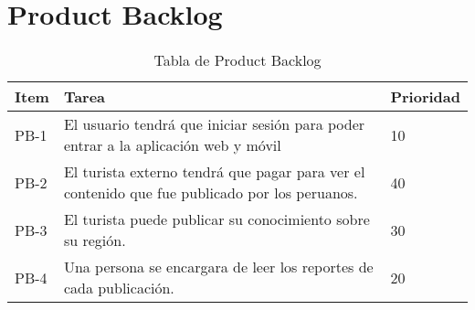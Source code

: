 \chapter{Product Backlog}
\begin{table}[htbp]
	\begin{center}
		\begin{tabular}{|l|p{5cm}|l|}
			\hline
			Item & Tarea & Prioridad \\
			\hline \hline
			PB-1 & El usuario tendrá que iniciar sesión para poder entrar a la aplicación web y móvil			
			& 10
			\\ \hline
			PB-2 & El turista externo tendrá que pagar para ver el contenido que fue publicado por los peruanos. & 40		
			\\ \hline
			PB-3 & El turista puede publicar su conocimiento sobre su región.			
			& 30
			\\ \hline
			PB-4 & Una persona se encargara de leer los reportes de cada publicación.						
			& 20
			\\ \hline
		\end{tabular}
		\caption {Tabla de Product Backlog}
	\end{center}
\end{table}